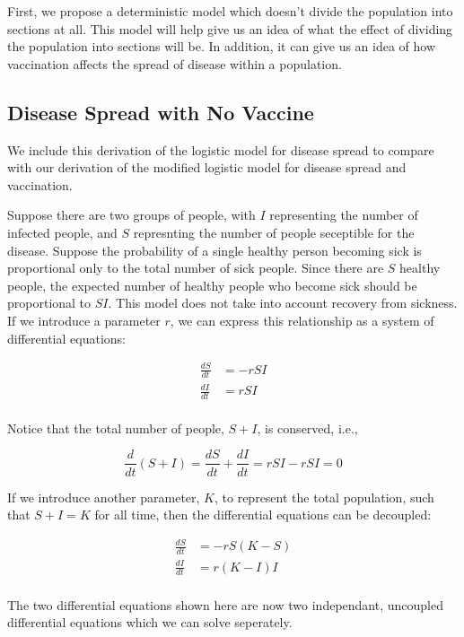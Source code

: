 \documentclass{article}
\begin{document}
First, we propose a deterministic model which doesn't divide the population
	into sections at all.
This model will help give us an idea of what the effect of dividing
	the population into sections will be.
In addition, it can give us an idea of how vaccination affects the spread of
	disease within a population.

\subsection{Disease Spread with No Vaccine}

We include this derivation of the logistic model for disease spread
	to compare with our derivation of the modified logistic model
	for disease spread and vaccination.

Suppose there are two groups of people, with $I$ representing the number of
	infected people, and $S$ represnting the number of people seceptible for the
	disease.
Suppose the probability of a single healthy person becoming sick is proportional
	only to the total number of sick people.
Since there are $S$ healthy people, the expected number of healthy people
	who become sick should be proportional to $S I$.
This model does not take into account recovery from sickness.
If we introduce a parameter $r$, we can express this relationship as a system
	of differential equations:

\begin{align*}
\frac{dS}{dt} & = - r S I \\
\frac{dI}{dt} & = r S I \\
\end{align*}

Notice that the total number of people, $S + I$, is conserved, i.e.,

\[ \frac{d}{dt} \left( S + I \right) = \frac{dS}{dt} + \frac{dI}{dt}
	= r S I - r S I = 0 \]

If we introduce another parameter, $K$, to represent the total population,
	such that $S + I = K$ for all time, then the differential equations
	can be decoupled:

\begin{align*}
\frac{dS}{dt} & = - r S (K - S) \\
\frac{dI}{dt} & = r (K - I) I \\
\end{align*}

The two differential equations shown here are now two independant, uncoupled
	differential equations which we can solve seperately.
\end{document}

